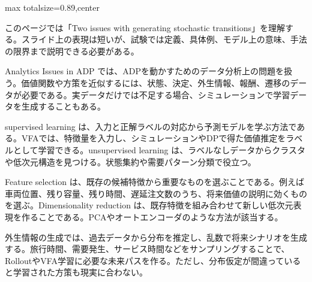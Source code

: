 \begin{minipage}[t]{0.58\textwidth}
\begin{adjustbox}{max totalsize={\textwidth}{0.89\textheight},center}
\begin{minipage}{\textwidth}\scriptsize
{}このページでは「Two issues with generating stochastic transitions」を理解する。スライド上の表現は短いが、試験では定義、具体例、モデル上の意味、手法の限界まで説明できる必要がある。\par
Analytics Issues in ADP では、ADPを動かすためのデータ分析上の問題を扱う。価値関数や方策を近似するには、状態、決定、外生情報、報酬、遷移のデータが必要である。実データだけでは不足する場合、シミュレーションで学習データを生成することもある。\par
supervised learning は、入力と正解ラベルの対応から予測モデルを学ぶ方法である。VFAでは、特徴量を入力し、シミュレーションやDPで得た価値推定をラベルとして学習できる。unsupervised learning は、ラベルなしデータからクラスタや低次元構造を見つける。状態集約や需要パターン分類で役立つ。\par
Feature selection は、既存の候補特徴から重要なものを選ぶことである。例えば車両位置、残り容量、残り時間、遅延注文数のうち、将来価値の説明に効くものを選ぶ。Dimensionality reduction は、既存特徴を組み合わせて新しい低次元表現を作ることである。PCAやオートエンコーダのような方法が該当する。\par
外生情報の生成では、過去データから分布を推定し、乱数で将来シナリオを生成する。旅行時間、需要発生、サービス時間などをサンプリングすることで、RolloutやVFA学習に必要な未来パスを作る。ただし、分布仮定が間違っていると学習された方策も現実に合わない。\par

\end{minipage}
\end{adjustbox}
\end{minipage}
